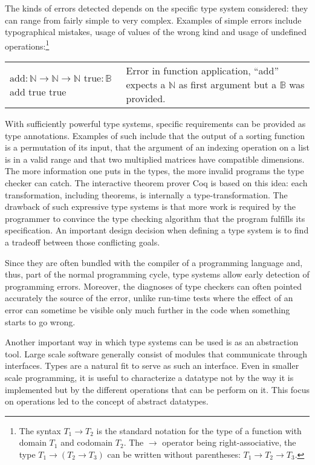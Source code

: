 The kinds of errors detected depends on the specific type system considered: they can range from
fairly simple to very complex. Examples of simple errors include typographical mistakes, usage of
values of the wrong kind and usage of undefined operations:\footnote{The syntax $T_1 \to T_2$ is the
standard notation for the type of a function with domain $T_1$ and codomain $T_2$. The $\to$
operator being right-associative, the type $T_1 \to (T_2 \to T_3)$ can be written without
parentheses: $T_1 \to T_2 \to T_3$.}

\begin{center}
  \begin{tabular}{m{3.5cm} | m{5.5cm}}
    $\text{add} : \mathbb{N} \to \mathbb{N} \to \mathbb{N}$ \newline
    $\text{true} : \mathbb{B}$ \newline
    add true true
    & Error in function application, ``add'' expects a $\mathbb{N}$ as first argument but a
    $\mathbb{B}$ was provided.
  \end{tabular}
\end{center}

With sufficiently powerful type systems, specific requirements can be provided as type annotations.
Examples of such include that the output of a sorting function is a permutation of its input, that
the argument of an indexing operation on a list is in a valid range and that two multiplied matrices
have compatible dimensions. The more information one puts in the types, the more invalid programs
the type checker can catch. The interactive theorem prover Coq is based on this idea: each
transformation, including theorems, is internally a type-transformation. The drawback of such
expressive type systems is that more work is required by the programmer to convince the type
checking algorithm that the program fulfills its specification.  An important design decision when
defining a type system is to find a tradeoff between those conflicting goals.

Since they are often bundled with the compiler of a programming language and, thus, part of the
normal programming cycle, type systems allow early detection of programming errors. Moreover, the
diagnoses of type checkers can often pointed accurately the source of the error, unlike run-time
tests where the effect of an error can sometime be visible only much further in the code when
something starts to go wrong.

Another important way in which type systems can be used is as an abstraction tool. Large scale
software generally consist of modules that communicate through interfaces. Types are a natural fit
to serve as such an interface. Even in smaller scale programming, it is useful to characterize a
datatype not by the way it is implemented but by the different operations that can be perform on it.
This focus on operations led to the concept of abstract datatypes.

